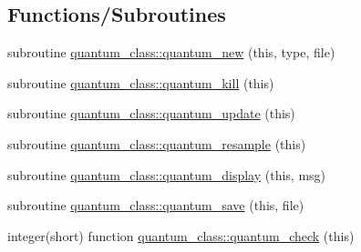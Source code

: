 \subsection*{Functions/\+Subroutines}
\begin{DoxyCompactItemize}
\item 
subroutine \hyperlink{namespacequantum__class_a3170f42702712b16bcc152509752f18e}{quantum\+\_\+class\+::quantum\+\_\+new} (this, type, file)
\item 
subroutine \hyperlink{namespacequantum__class_a1c73725245a04e63092d2152579c4bd9}{quantum\+\_\+class\+::quantum\+\_\+kill} (this)
\item 
subroutine \hyperlink{namespacequantum__class_afef9cff48e6cd580f47a06f4adc4109b}{quantum\+\_\+class\+::quantum\+\_\+update} (this)
\item 
subroutine \hyperlink{namespacequantum__class_a496266b0eb772dd0e7d8ce9d8439945a}{quantum\+\_\+class\+::quantum\+\_\+resample} (this)
\item 
subroutine \hyperlink{namespacequantum__class_a163174aa7cc6ae0a03b2269c55ca05b8}{quantum\+\_\+class\+::quantum\+\_\+display} (this, msg)
\item 
subroutine \hyperlink{namespacequantum__class_aa60138cf5e19494d1f29b63053b32f24}{quantum\+\_\+class\+::quantum\+\_\+save} (this, file)
\item 
integer(short) function \hyperlink{namespacequantum__class_a7ed38fd0b1d221dd04ca645722602f7d}{quantum\+\_\+class\+::quantum\+\_\+check} (this)
\end{DoxyCompactItemize}

